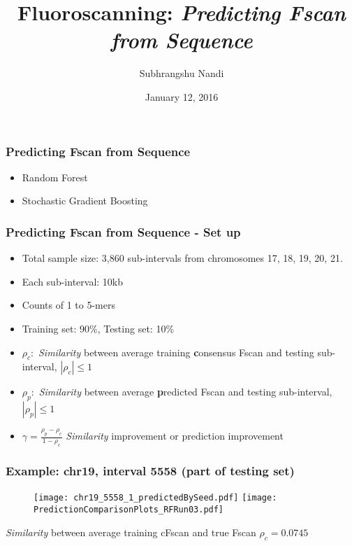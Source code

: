\documentclass[10pt,dvipsnames,table]{beamer}
\title[Fluoroscanning]{Fluoroscanning: {\emph{Predicting Fscan from Sequence}}}
\author[S. Nandi]{Subhrangshu Nandi}
\date{January 12, 2016}
\begin{document}
\setlength{\baselineskip}{16truept}
\frame{\maketitle}

\begin{frame}
\frametitle{Predicting Fscan from Sequence}
\begin{itemize}
\item Random Forest
\vspace{1in}
\item Stochastic Gradient Boosting
\end{itemize}
\end{frame}

\begin{frame}
\frametitle{Predicting Fscan from Sequence - Set up}
\begin{itemize}
\item Total sample size: 3,860 sub-intervals from chromosomes 17, 18, 19, 20, 21.
\item Each sub-interval: 10kb
\item Counts of 1 to 5-mers
\item Training set: 90\%, Testing set: 10\%
\pause
\item $\rho_{c}:$ {\emph{Similarity}} between average training {\bf{c}}onsensus Fscan and testing sub-interval, $|\rho_{c}| \leq 1$
\item $\rho_{p}:$ {\emph{Similarity}} between average {\bf{p}}redicted Fscan and testing sub-interval, $|\rho_{p}| \leq 1$
\item $\gamma = \frac{\rho_{p} - \rho_{c}}{1 - \rho_{c}} $ {\emph{Similarity}} improvement or prediction improvement
\end{itemize}
\end{frame}

\begin{frame}
\frametitle{Example: chr19, interval 5558 (part of testing set)}
\begin{figure}
\texttt{[image: chr19\_5558\_1\_predictedBySeed.pdf]}
\texttt{[image: PredictionComparisonPlots\_RFRun03.pdf]}
\end{figure}

\begin{block}{{\emph{Similarity}} between average training cFscan and true Fscan}
 $\rho_{c} = 0.0745$
\end{block}
\end{frame}
\end{document}

